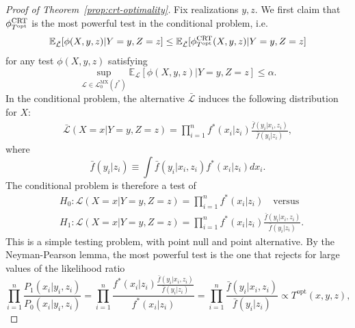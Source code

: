 \documentclass[12pt]{article}
\theoremstyle{definition}
\theoremstyle{remark}
\newcommand{\srx}{X}
\newcommand{\sfx}{x}
\newcommand{\srz}{Z}
\newcommand{\sfz}{z}
\newcommand{\sry}{Y}
\newcommand{\sfy}{y}
\def\CRT{\textnormal{CRT}}
\begin{document}
\begin{proof}[Proof of Theorem~\ref{prop:crt-optimality}]
	Fix realizations $\sfy, \sfz$. We first claim that $\phi^{\CRT}_{T^{\textnormal{opt}}}$ is the most powerful test in the conditional problem, i.e.
	\begin{equation}
		\mathbb E_{\bar{\mathcal L}}[\phi(\srx,\sfy,\sfz)|\sry = \sfy, \srz = \sfz] \leq \mathbb E_{\bar{\mathcal L}}[\phi^{\CRT}_{T^\textnormal{opt}}(\srx, \sfy, \sfz)|\sry = \sfy, \srz = \sfz]
		\label{conditional-optimality}
	\end{equation}
	for any test $\phi(\srx, \sfy, \sfz)$ satisfying
	\begin{equation}
		\sup_{\mathcal L \in \mathscr L_0^{\text{MX}}(f^*)}\mathbb E_{\mathcal L}[\phi(\srx,\sfy,\sfz)|\sry = \sfy, \srz = \sfz] \leq \alpha.
		\label{eq:conditional-level}
	\end{equation}
	In the conditional problem, the alternative $\bar{\mathcal L}$ induces the following distribution for $\srx$:
	\begin{equation}
		\begin{split}
			\bar{\mathcal L}(\srx = \sfx|\sry = \sfy, \srz = \sfz) = \prod_{i = 1}^n  f^*(\sfx_i|\sfz_i)\tfrac{\bar f(\sfy_i|\sfx_i, \sfz_i)}{\bar f(\sfy_i|\sfz_i)},
			\label{conditional-alternative}
		\end{split}
	\end{equation}
	where
	\begin{equation*}
	\bar f(\sfy_i|\sfz_i) \equiv \int \bar f(\sfy_i|\sfx_i, \sfz_i)f^*(\sfx_i|\sfz_i)d\sfx_i.
	\end{equation*}	
	The conditional problem is therefore a test of 
	\begin{equation*}
		\begin{split}
			&H_0: \mathcal L(\srx = \sfx|\sry = \sfy, \srz = \sfz) = \prod_{i = 1}^n  f^*(\sfx_i | \sfz_i) \quad \text{versus} \\
			&H_1: \mathcal L(\srx = \sfx|\sry = \sfy, \srz = \sfz) = \prod_{i = 1}^n  f^*(\sfx_i|\sfz_i)\tfrac{\bar f(\sfy_i|\sfx_i, \sfz_i)}{\bar f(\sfy_i|\sfz_i)}.
		\end{split}
	\end{equation*}
	This is a simple testing problem, with point null and point alternative. By the Neyman-Pearson lemma, the most powerful test is the one that rejects for large values of the likelihood ratio
	\begin{equation}
		\prod_{i = 1}^n \frac{P_1(\sfx_i|\sfy_i, \sfz_i)}{P_0(\sfx_i|\sfy_i, \sfz_i)} = \prod_{i = 1}^n \frac{f^*(\sfx_i|\sfz_i)\frac{\bar f(\sfy_i|\sfx_i, \sfz_i)}{\bar f(\sfy_i|\sfz_i)}}{f^*(\sfx_i|\sfz_i)} = \prod_{i = 1}^n \frac{\bar f(\sfy_i|\sfx_i, \sfz_i)}{\bar f(\sfy_i|\sfz_i)} \propto T^{\text{opt}}(\sfx, \sfy, \sfz),

\end{equation}
\end{proof}
\end{document}
